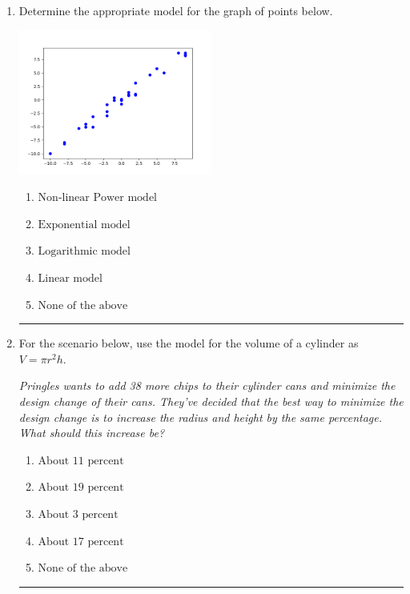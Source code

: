 \documentclass[14pt]{extbook}
\newcommand{\litem}[1]{\item#1\hspace*{-1cm}\rule{\textwidth}{0.4pt}}
\begin{document}
\begin{enumerate}
{\begin{enumerate}[label=\Alph*.]
\end{enumerate} }
\litem{
Determine the appropriate model for the graph of points below.
\begin{center}
    \includegraphics[width=0.5\textwidth]{../Figures/identifyModelGraph12A.png}
\end{center}
\begin{enumerate}[label=\Alph*.]
\item \( \text{Non-linear Power model} \)
\item \( \text{Exponential model} \)
\item \( \text{Logarithmic model} \)
\item \( \text{Linear model} \)
\item \( \text{None of the above} \)

\end{enumerate} }
\litem{
For the scenario below, use the model for the volume of a cylinder as $V = \pi r^2 h$.
\begin{center}
    \textit{ Pringles wants to add 38 \text{percent} more chips to their cylinder cans and minimize the design change of their cans. They've decided that the best way to minimize the design change is to increase the radius and height by the same percentage. What should this increase be? }
\end{center}
\begin{enumerate}[label=\Alph*.]
\item \( \text{About } 11 \text{ percent} \)
\item \( \text{About } 19 \text{ percent} \)
\item \( \text{About } 3 \text{ percent} \)
\item \( \text{About } 17 \text{ percent} \)
\item \( \text{None of the above} \)


\end{enumerate}}
\end{enumerate}
\end{document}
